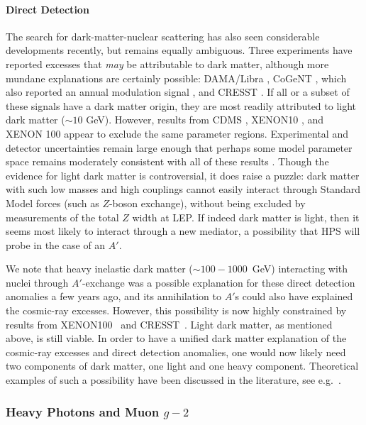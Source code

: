 \paragraph{Direct Detection}
 The search for dark-matter-nuclear scattering has also seen considerable developments recently, but remains equally ambiguous.  Three experiments have reported excesses that \emph{may} be attributable to dark matter, although more mundane explanations 
are certainly possible: DAMA/Libra \cite{Bernabei:2010mq}, CoGeNT \cite{Aalseth:2010vx}, which also reported an annual modulation signal \cite{Aalseth:2011wp}, and CRESST \cite{Angloher:2011uu}. 
If all or a subset of these signals have a dark matter origin,  they are most readily attributed to light dark matter ($\sim 10$ GeV).  
However, results from CDMS \cite{CDMS}, XENON10 \cite{Angle:2011th}, and XENON 100 \cite{Aprile:2011hi} appear to exclude the same parameter regions.  Experimental and detector uncertainties remain large enough that perhaps some model parameter space remains 
moderately consistent with all of these results \cite{Kelso:2011gd}.  
Though the evidence for light dark matter is controversial, it does raise a puzzle: dark matter with such low masses and high couplings cannot easily interact through Standard Model forces (such as $Z$-boson exchange), without being excluded by measurements of the total $Z$ width at LEP. If indeed dark matter is light, then it seems most likely to interact through a new mediator, a possibility that HPS will probe in the case of an $A'$.

We note that heavy inelastic dark matter ($\sim 100-1000$~GeV) interacting with nuclei through $A'$-exchange was a possible explanation for 
these direct detection anomalies a few years ago, and its annihilation to $A'$s could also have explained the cosmic-ray excesses.  However, 
this possibility is now highly constrained by results from XENON100~\cite{Aprile:2011ts} and CRESST~\cite{Angloher:2011uu}.  Light dark matter, 
as mentioned above, is still viable.  In order to have a unified dark matter explanation of the cosmic-ray excesses and direct detection 
anomalies, one would now likely need two components of dark matter, one light and one heavy component.  Theoretical examples of 
such a possibility have been discussed in the literature, see e.g.~\cite{Essig:2010ye}.


\subsubsection{Heavy Photons and Muon $g-2$}

